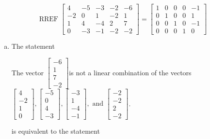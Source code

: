 \begin{exerciseAnswer} 
\[\operatorname{RREF}  \left[\begin{array}{cccc|c}
4 & -5 & -3 & -2 & -6 \\
-2 & 0 & 1 & -2 & 1 \\
1 & 4 & -4 & 2 & 7 \\
0 & -3 & -1 & -2 & -2
\end{array}\right] = \left[\begin{array}{cccc|c}
1 & 0 & 0 & 0 & -1 \\
0 & 1 & 0 & 0 & 1 \\
0 & 0 & 1 & 0 & -1 \\
0 & 0 & 0 & 1 & 0
\end{array}\right] \]
\begin{enumerate}[(a)]
\item  The statement 
\begin{center}\begin{minipage}{0.8\textwidth}
 The vector \( \left[\begin{array}{c}
-6 \\
1 \\
7 \\
-2
\end{array}\right] \)is not a linear combination of the vectors \( \left[\begin{array}{c}
4 \\
-2 \\
1 \\
0
\end{array}\right] , \left[\begin{array}{c}
-5 \\
0 \\
4 \\
-3
\end{array}\right] , \left[\begin{array}{c}
-3 \\
1 \\
-4 \\
-1
\end{array}\right] , \text{ and } \left[\begin{array}{c}
-2 \\
-2 \\
2 \\
-2
\end{array}\right] \). 
\end{minipage}\end{center}
     is equivalent to the statement 
\begin{center}\begin{minipage}{0.8\textwidth}

\end{minipage}
\end{center}
\end{enumerate}
\end{exerciseAnswer}
